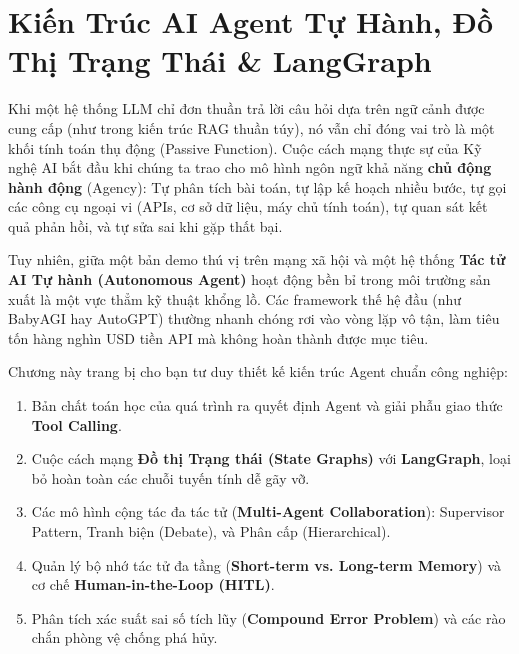 
\chapter{Kiến Trúc AI Agent Tự Hành, Đồ Thị Trạng Thái \& LangGraph}
\label{ch:autonomous-agents}

Khi một hệ thống LLM chỉ đơn thuần trả lời câu hỏi dựa trên ngữ cảnh được cung cấp (như trong kiến trúc RAG thuần túy), nó vẫn chỉ đóng vai trò là một khối tính toán thụ động (Passive Function). Cuộc cách mạng thực sự của Kỹ nghệ AI bắt đầu khi chúng ta trao cho mô hình ngôn ngữ khả năng \textbf{chủ động hành động} (Agency): Tự phân tích bài toán, tự lập kế hoạch nhiều bước, tự gọi các công cụ ngoại vi (APIs, cơ sở dữ liệu, máy chủ tính toán), tự quan sát kết quả phản hồi, và tự sửa sai khi gặp thất bại.

Tuy nhiên, giữa một bản demo thú vị trên mạng xã hội và một hệ thống \textbf{Tác tử AI Tự hành (Autonomous Agent)} hoạt động bền bỉ trong môi trường sản xuất là một vực thẳm kỹ thuật khổng lồ. Các framework thế hệ đầu (như BabyAGI hay AutoGPT) thường nhanh chóng rơi vào vòng lặp vô tận, làm tiêu tốn hàng nghìn USD tiền API mà không hoàn thành được mục tiêu.

Chương này trang bị cho bạn tư duy thiết kế kiến trúc Agent chuẩn công nghiệp:
\begin{enumerate}
  \item Bản chất toán học của quá trình ra quyết định Agent và giải phẫu giao thức \textbf{Tool Calling}.
  \item Cuộc cách mạng \textbf{Đồ thị Trạng thái (State Graphs)} với \textbf{LangGraph}, loại bỏ hoàn toàn các chuỗi tuyến tính dễ gãy vỡ.
  \item Các mô hình cộng tác đa tác tử (\textbf{Multi-Agent Collaboration}): Supervisor Pattern, Tranh biện (Debate), và Phân cấp (Hierarchical).
  \item Quản lý bộ nhớ tác tử đa tầng (\textbf{Short-term vs. Long-term Memory}) và cơ chế \textbf{Human-in-the-Loop (HITL)}.
  \item Phân tích xác suất sai số tích lũy (\textbf{Compound Error Problem}) và các rào chắn phòng vệ chống phá hủy.
\end{enumerate}

